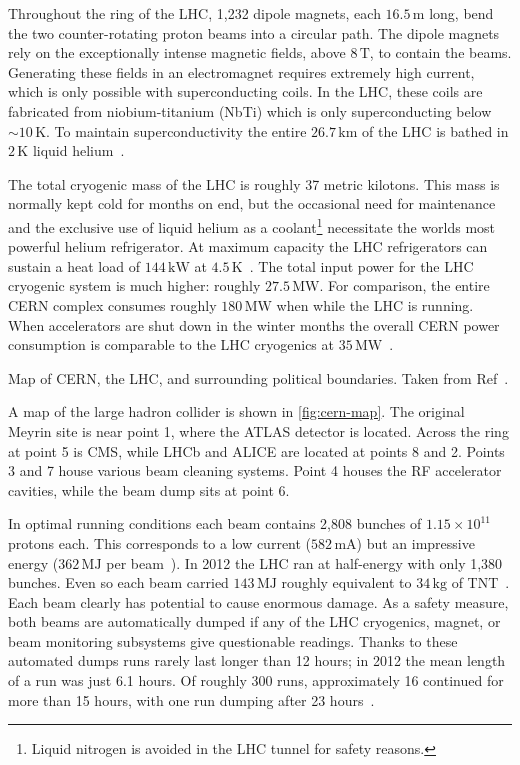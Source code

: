 Throughout the ring of the LHC, 1,232 dipole magnets, each $16.5\,\text{m}$ long, bend the two counter-rotating proton beams into a circular path. The dipole magnets rely on the exceptionally intense magnetic fields, above $8\,\mathrm{T}$, to contain the beams.
Generating these fields in an electromagnet requires extremely high current, which is only possible with superconducting coils.
In the LHC, these coils are fabricated from niobium-titanium (NbTi) which is only superconducting below $\sim 10\,\text{K}$.
To maintain superconductivity the entire $26.7\,\mathrm{km}$ of the LHC is bathed in $2\,\text{K}$ liquid helium~\cite{lhc-machine}.

The total cryogenic mass of the LHC is roughly 37 metric kilotons.
This mass is normally kept cold for months on end, but the occasional need for maintenance and the exclusive use of liquid helium as a coolant\footnote{Liquid nitrogen is avoided in the LHC tunnel for safety reasons.} necessitate the worlds most powerful helium refrigerator. At maximum capacity the LHC refrigerators can sustain a heat load of $144\,\mathrm{kW}$ at $4.5\,\mathrm{K}$~\cite{lhc-machine}.
The total input power for the LHC cryogenic system is much higher: roughly $27.5\,\text{MW}$.
For comparison, the entire CERN complex consumes roughly $180\,\text{MW}$ when while the LHC is running. When accelerators are shut down in the winter months the overall CERN power consumption is comparable to the LHC cryogenics at $35\,\text{MW}$~\cite{lhc-energy}.

\begin{cfig}
  \caption[CERN Map]{Map of CERN, the LHC, and surrounding political boundaries. Taken from Ref~\cite{cern-map}.}
  \label{fig:cern-map}
\end{cfig}

A map of the large hadron collider is shown in \cref{fig:cern-map}.
The original Meyrin site is near point 1, where the ATLAS detector is located.
Across the ring at point 5 is CMS, while LHCb and ALICE are located at points 8 and 2.
Points 3 and 7 house various beam cleaning systems.
Point 4 houses the RF accelerator cavities, while the beam dump sits at point 6.

In optimal running conditions each beam contains 2,808 bunches of $1.15 \times 10^{11}$ protons each.
This corresponds to a low current ($582\,\text{mA}$) but an impressive energy ($362\,\text{MJ}$ per beam~\cite{lhc-machine}).
In 2012 the LHC ran at half-energy with only 1,380 bunches.
Even so each beam carried $143\,\text{MJ}$ roughly equivalent to $34\,\text{kg}$ of TNT~\cite{lhc-run1}.
Each beam clearly has potential to cause enormous damage.
As a safety measure, both beams are automatically dumped if any of the LHC cryogenics, magnet, or beam monitoring subsystems give questionable readings.
Thanks to these automated dumps runs rarely last longer than 12 hours; in 2012 the mean length of a run was just 6.1 hours.
Of roughly 300 runs, approximately 16 continued for more than 15 hours, with one run dumping after 23 hours~\cite{lhc-run1}.

